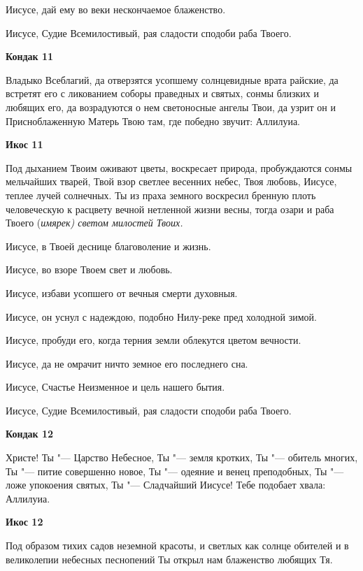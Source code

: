 Иисусе, дай ему во веки нескончаемое блаженство. 

Иисусе, Судие Всемилостивый, рая сладости сподоби раба Твоего.


\medskip


\bfseries Кондак 11\normalfont{}


Владыко Всеблагий, да отверзятся усопшему солнцевидные врата райские, да встретят его с ликованием соборы праведных и святых, сонмы близких и любящих его, да возрадуются о нем светоносные ангелы Твои, да узрит он и Присноблаженную Матерь Твою там, где победно звучит: Аллилуиа.


\medskip


\bfseries Икос 11\normalfont{}


Под дыханием Твоим оживают цветы, воскресает природа, пробуждаются сонмы мельчайших тварей, Твой взор светлее весенних небес, Твоя любовь, Иисусе, теплее лучей солнечных. Ты из праха земного воскресил бренную плоть человеческую к расцвету вечной нетленной жизни весны, тогда озари и раба Твоего (\itshape имярек\normalfont{}) светом милостей Твоих. 

Иисусе, в Твоей деснице благоволение и жизнь. 

Иисусе, во взоре Твоем свет и любовь. 

Иисусе, избави усопшего от вечныя смерти духовныя. 

Иисусе, он уснул с надеждою, подобно Нилу-реке пред холодной зимой. 

Иисусе, пробуди его, когда терния земли облекутся цветом вечности. 

Иисусе, да не омрачит ничто земное его последнего сна. 

Иисусе, Счастье Неизменное и цель нашего бытия. 

Иисусе, Судие Всемилостивый, рая сладости сподоби раба Твоего.


\medskip


\bfseries Кондак 12\normalfont{}


Христе! Ты "--- Царство Небесное, Ты "--- земля кротких, Ты "--- обитель многих, Ты "--- питие совершенно новое, Ты "--- одеяние и венец преподобных, Ты "--- ложе упокоения святых, Ты "--- Сладчайший Иисусе! Тебе подобает хвала: Аллилуиа.


\medskip


\bfseries Икос 12\normalfont{}


Под образом тихих садов неземной красоты, и светлых как солнце обителей и в великолепии небесных песнопений Ты открыл нам блаженство любящих Тя. 

